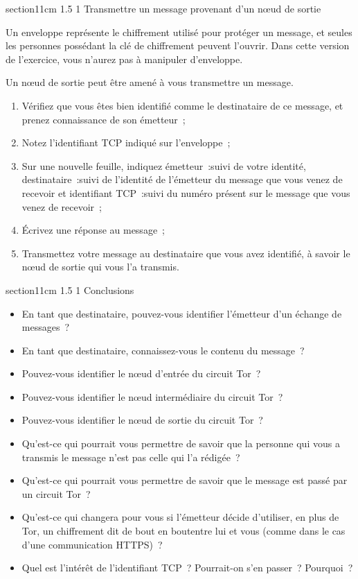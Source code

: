 \documentclass[a4paper,twoside,french]{article}
\makeatletter
\renewcommand\section{\@startsection
  {section}{1}{1cm}%
  {1.5\baselineskip}%
  {1\baselineskip}%
  {\normalfont\Large\bfseries}}%
\makeatother
\begin{document}
  \section{Transmettre un message provenant d'un n\oe ud de sortie}

  Un enveloppe représente le chiffrement utilisé pour protéger un
  message, et seules les personnes possédant la clé de chiffrement
  peuvent l'ouvrir. Dans cette version de l'exercice, vous n'aurez pas
  à manipuler d'enveloppe.

  Un n\oe ud de sortie peut être amené à vous transmettre un
  message.

  \begin{enumerate}
  \item Vérifiez que vous êtes bien identifié comme le destinataire de
    ce message, et prenez connaissance de son émetteur~;
  \item Notez l'identifiant TCP indiqué sur l'enveloppe~;
  \item Sur une nouvelle feuille, indiquez \og émetteur~:\fg suivi de
    votre identité, \og destinataire~:\fg suivi de l'identité de
    l'émetteur du message que vous venez de recevoir et \og
    identifiant TCP~:\fg suivi du numéro présent sur le message que
    vous venez de recevoir~;
  \item Écrivez une réponse au message~;
  \item Transmettez votre message au destinataire que vous avez
    identifié, à savoir le n\oe ud de sortie qui vous l'a transmis.
  \end{enumerate}

  \section{Conclusions}

  \begin{itemize}
  \item En tant que destinataire, pouvez-vous identifier
    l'émetteur d'un échange de messages~?
  \item En tant que destinataire, connaissez-vous le contenu du
    message~?
  \item Pouvez-vous identifier le n\oe ud d'entrée du circuit Tor~?
  \item Pouvez-vous identifier le n\oe ud intermédiaire du circuit Tor~?
  \item Pouvez-vous identifier le n\oe ud de sortie du circuit Tor~?
  \item Qu'est-ce qui pourrait vous permettre de savoir que la
    personne qui vous a transmis le message n'est pas celle qui l'a
    rédigée~?
  \item Qu'est-ce qui pourrait vous permettre de savoir que le message
    est passé par un circuit Tor~?
  \item Qu'est-ce qui changera pour vous si l'émetteur décide
    d'utiliser, en plus de Tor, un chiffrement dit \og de bout en
    bout\fg entre lui et vous (comme dans le cas d'une
    communication HTTPS)~?
  \item Quel est l'intérêt de l'identifiant TCP~? Pourrait-on s'en
    passer~? Pourquoi~?
  \end{itemize}

  
		
\end{document}
